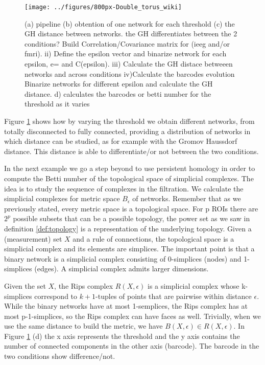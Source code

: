 \documentclass[onecollarge,runningheads]{svjour2}
\begin{document}
\begin{figure}[h]
        \centering
        \texttt{[image: ../figures/800px-Double\_torus\_wiki]}
        \caption{(a) pipeline (b) obtention of one network for each threshold (c) the GH distance between networks. the GH differentiates between the 2 conditions? Build Correlation/Covariance matrix for (ieeg and/or fmri). ii) Define the epsilon vector and binarize network for each epsilon, e={} and C(epsilon). iii) Calculate the GH distace betweeen networks and across conditions iv)Calculate the barcodes evolution
        Binarize networks for different epsilon and calculate the GH distance. d) calculates the barcodes or betti number for the threshold as it varies
}
\label{fig:ph1}
\end{figure}

Figure \ref{fig:ph1} shows how by varying the threshold we obtain different networks, from totally disconnected to fully connected,  providing a distribution of networks in which distance can be studied, as for example with the Gromov Haussdorf distance. This distance is able to differentiate/or not between the two conditions.

In the next example we go a step beyond to use persistent homology in order to compute the Betti number of the topological space of simplicial complexes. The idea is to study the sequence of complexes in the filtration. %
We calculate the simplicial complexes for metric space $B_\epsilon$ of networks. Remember that as
we previously stated, every metric space is a topological space.
For p ROIs there are $2^p$ possible subsets that can be a possible topology, the power set as we saw in definition \ref{def:topology} is a representation of the underlying topology.
Given a (measurement) set $X$ and a rule of connections, the topological space is a simplicial complex and its elements are simplices. %
The important point is that a binary network is a simplicial complex consisting of 0-simplices (nodes) and 1-simplices (edges). A simplicial complex admits larger dimensions.

Given the set $X$, the Rips complex $R(X,\epsilon)$ is a simplicial complex whose k-simplices correspond to $k+1$-tuples of points that are pairwise within distance $\epsilon$.
While the binary networks have at most 1-semplices, the Rips complex has at most p-1-simplices, so the Rips complex can have faces as well. Trivially, when we use the same distance to build the metric, we have $B(X,\epsilon) \in R(X,\epsilon)$.
In Figure \ref{fig:ph1} (d) the x axis represents the threshold  and the y axis contains the number of connected components in the other axis (barcode). The barcode in the two conditions show difference/not.
\end{document}
